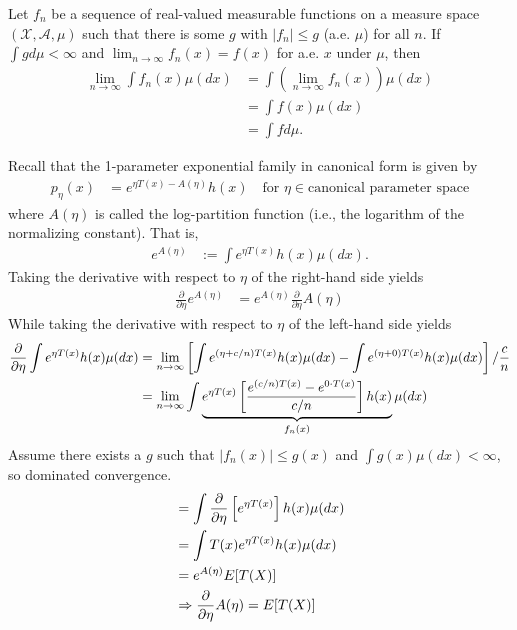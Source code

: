 \documentclass[twoside]{article}
\begin{document}
\begin{theorem}\citep[Theorem 2.5, p.~29]{keener}
  Let ${f_n}$ be a sequence of real-valued measurable functions on a
  measure space $(\mathcal X, \mathcal A, \mu)$ such that there is some
  $g$ with $|f_n| \le g$ (a.e. $\mu$) for all $n$.  If $\int g d\mu < \infty$
  and $\lim_{n \rightarrow \infty} f_n(x) = f(x)$ for a.e. $x$ under $\mu$,
  then
  \begin{align*}
    \lim_{n \rightarrow \infty} \int f_n(x) \mu(dx) &= \int
      \left(\lim_{n \rightarrow \infty} f_n(x) \right) \mu(dx) \\
       &= \int f(x) \mu(dx) \\
       &= \int f d\mu.
  \end{align*} 
\end{theorem}

\begin{example}
Recall that the 1-parameter exponential family in canonical form is given by
\begin{align*}
  p_\eta(x) &= e^{\eta T(x) - A(\eta)} h(x) \quad \text{for }
  \eta \in \text{canonical parameter space}
\end{align*}
where $A(\eta)$ is called the log-partition function (i.e., the
logarithm of the normalizing constant).  That is,
\begin{align*}
  e^{A(\eta)} &:= \int e^{\eta T(x)} h(x) \mu(dx).
\end{align*}
Taking the derivative with respect to $\eta$ of the right-hand side yields
\begin{align}
  \frac{\partial}{\partial \eta} e^{A(\eta)} &= e^{A(\eta)}
    \frac{\partial}{\partial \eta}A(\eta)
\end{align}
While taking the derivative with respect to $\eta$ of the left-hand side
yields
\begin{align}
  \frac{\partial}{\partial \eta} \int e^{\eta T(x)} h(x) \mu(dx)
  &= \lim_{n \rightarrow \infty} \left[ \int e^{(\eta + c/n)T(x)} h(x) \mu(dx) -
  \int e^{(\eta + 0)T(x)} h(x) \mu(dx) \right]/ \frac{c}{n} \notag\\
  &= \lim_{n \rightarrow \infty} \int \underbrace{e^{\eta T(x)} \left[
  \frac{e^{(c/n)T(x)} - e^{0 \cdot T(x)}}{c/n} \right] h(x)}_{f_n(x)} \mu(dx)
\end{align}
Assume there exists a $g$ such that $|f_n(x)| \le g(x)$ and
$\int g(x) \mu(dx) < \infty$, so dominated convergence.
\begin{align*}
  &= \int \frac{\partial}{\partial \eta} \left[e^{\eta T(x)}\right] h(x) \mu(dx) \\
  &= \int T(x) e^{\eta T(x)} h(x) \mu(dx)  \\
  &= e^{A(\eta)} E[T(X)] \\
  &\Rightarrow \frac{\partial}{\partial \eta} A(\eta) = E[T(X)]
\end{align*}
\end{example}




\end{document}
